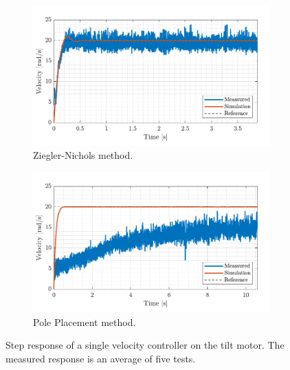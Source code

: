 \documentclass[../../main.tex]{subfiles}
\begin{document}
\begin{figure}[h]
     \centering
     \begin{subfigure}[b]{0.49\textwidth}
         \centering
         \includegraphics[width=\textwidth]{Sections/Test/Images/VelControllerTestZN.pdf}
         \caption{Ziegler-Nichols method.}
         \label{fig:StepVelZN}
     \end{subfigure}
     \hfill
     \begin{subfigure}[b]{0.49\textwidth}
         \centering
         \includegraphics[width=\textwidth]{Sections/Test/Images/VelControllerTestPP.pdf}
         \caption{Pole Placement method.}
         \label{fig:StepVelModel}
     \end{subfigure}
        \caption{Step response of a single velocity controller on the tilt motor. The measured response is an average of five tests.}
        \label{fig:VelocityTilt}
\end{figure}
\end{document}
